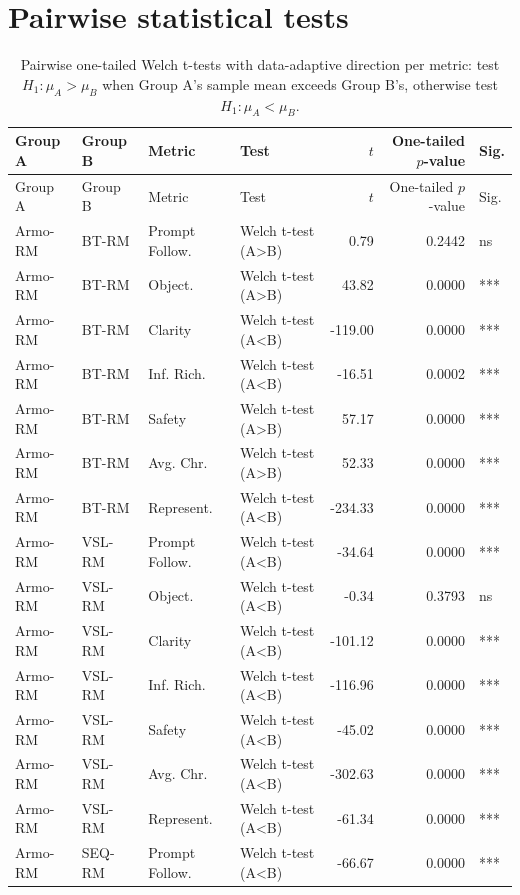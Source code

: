 \documentclass{article}
\begin{document}
\section*{Pairwise statistical tests}

\begin{longtable}{llllrrl}
\caption{Pairwise one-tailed Welch t-tests with data-adaptive direction per metric: test $H_1: \mu_{A} > \mu_{B}$ when Group A's sample mean exceeds Group B's, otherwise test $H_1: \mu_{A} < \mu_{B}$.}\label{tab:pairwise-tests}\\
\toprule
Group A & Group B & Metric & Test & $t$ & One-tailed $p$-value & Sig. \\
\midrule
\endfirsthead
\toprule
Group A & Group B & Metric & Test & $t$ & One-tailed $p$-value & Sig. \\
\midrule
\endhead
\bottomrule
\endfoot
Armo-RM & BT-RM & Prompt Follow. & Welch t-test (A>B) & 0.79 & 0.2442 & ns \\
Armo-RM & BT-RM & Object. & Welch t-test (A>B) & 43.82 & 0.0000 & *** \\
Armo-RM & BT-RM & Clarity & Welch t-test (A<B) & -119.00 & 0.0000 & *** \\
Armo-RM & BT-RM & Inf. Rich. & Welch t-test (A<B) & -16.51 & 0.0002 & *** \\
Armo-RM & BT-RM & Safety & Welch t-test (A>B) & 57.17 & 0.0000 & *** \\
Armo-RM & BT-RM & Avg. Chr. & Welch t-test (A>B) & 52.33 & 0.0000 & *** \\
Armo-RM & BT-RM & Represent. & Welch t-test (A<B) & -234.33 & 0.0000 & *** \\
Armo-RM & VSL-RM & Prompt Follow. & Welch t-test (A<B) & -34.64 & 0.0000 & *** \\
Armo-RM & VSL-RM & Object. & Welch t-test (A<B) & -0.34 & 0.3793 & ns \\
Armo-RM & VSL-RM & Clarity & Welch t-test (A<B) & -101.12 & 0.0000 & *** \\
Armo-RM & VSL-RM & Inf. Rich. & Welch t-test (A<B) & -116.96 & 0.0000 & *** \\
Armo-RM & VSL-RM & Safety & Welch t-test (A<B) & -45.02 & 0.0000 & *** \\
Armo-RM & VSL-RM & Avg. Chr. & Welch t-test (A<B) & -302.63 & 0.0000 & *** \\
Armo-RM & VSL-RM & Represent. & Welch t-test (A<B) & -61.34 & 0.0000 & *** \\
Armo-RM & SEQ-RM & Prompt Follow. & Welch t-test (A<B) & -66.67 & 0.0000 & *** \\

\end{longtable}
\end{document}
